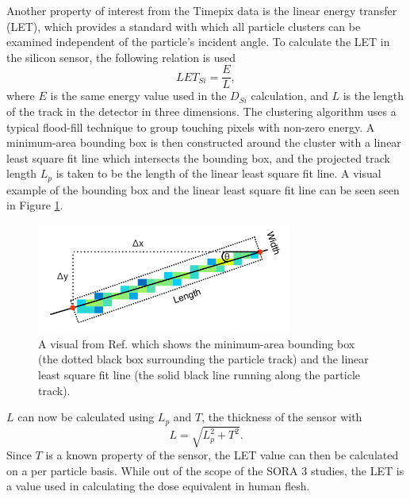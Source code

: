 Another property of interest from the Timepix data is the linear energy transfer (LET), which provides a standard with which all particle clusters can be examined independent of the particle's incident angle.
To calculate the LET in the silicon sensor, the following relation is used
\begin{equation*}
  LET_{Si} = \dfrac{E}{L},
\end{equation*}
where $E$ is the same energy value used in the $D_{Si}$ calculation, and $L$ is the length of the track in the detector in three dimensions.
The clustering algorithm uses a typical flood-fill technique to group touching pixels with non-zero energy.
A minimum-area bounding box is then constructed around the cluster with a linear least square fit line which intersects the bounding box, and the projected track length $L_p$ is taken to be the length of the linear least square fit line.
A visual example of the bounding box and the linear least square fit line can be seen seen in Figure \ref{fig:stuart-track-example}.
\begin{figure}[h!]
	\begin{center}
		\includegraphics[width=0.75\textwidth]{figures/stuart-track-example.png}
		\caption{A visual from Ref. \cite{Stuart-Thesis} which shows the minimum-area bounding box (the dotted black box surrounding the particle track) and the linear least square fit line (the solid black line running along the particle track).}
		\label{fig:stuart-track-example}
	\end{center}
\end{figure}
$L$ can now be calculated using $L_p$ and $T$, the thickness of the sensor with
\begin{equation*}
  L = \sqrt{L_p^2 + T^2}.
\end{equation*}
Since $T$ is a known property of the sensor, the LET value can then be calculated on a per particle basis.
While out of the scope of the SORA 3 studies, the LET is a value used in calculating the dose equivalent in human flesh.

